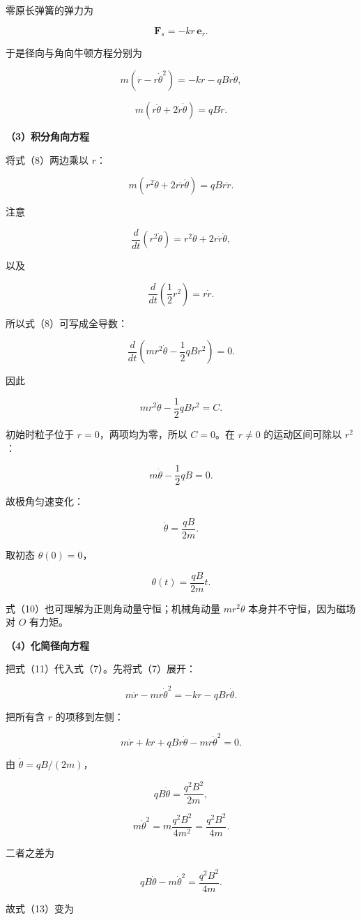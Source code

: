 \documentclass[12pt,a4paper,UTF8]{ctexart}
\begin{document}
零原长弹簧的弹力为

\[\bm F_s=-kr\,\bm e_r.\]

于是径向与角向牛顿方程分别为

\[m(\ddot r-r\dot\theta^2)=-kr-qBr\dot\theta,\]

\[m(r\ddot\theta+2\dot r\dot\theta)=qB\dot r.\]

\textbf{（3）积分角向方程}

将式（8）两边乘以 \(r\)：

\[m(r^2\ddot\theta+2r\dot r\dot\theta)=qBr\dot r.\]

注意

\[\frac{d}{dt}(r^2\dot\theta)=r^2\ddot\theta+2r\dot r\dot\theta,\]

以及

\[\frac{d}{dt}\left(\frac12r^2\right)=r\dot r.\]

所以式（8）可写成全导数：

\[\frac{d}{dt}\left(mr^2\dot\theta-\frac12qBr^2\right)=0.\]

因此

\[mr^2\dot\theta-\frac12qBr^2=C.\]

初始时粒子位于 \(r=0\)，两项均为零，所以 \(C=0\)。在 \(r\neq0\)
的运动区间可除以 \(r^2\)：

\[m\dot\theta-\frac12qB=0.\]

故极角匀速变化：

\[\boxed{\dot\theta=\frac{qB}{2m}}.\]

取初态 \(\theta(0)=0\)，

\[\boxed{\theta(t)=\frac{qB}{2m}t}.\]

式（10）也可理解为正则角动量守恒；机械角动量 \(mr^2\dot\theta\)
本身并不守恒，因为磁场对 \(O\) 有力矩。

\textbf{（4）化简径向方程}

把式（11）代入式（7）。先将式（7）展开：

\[m\ddot r-mr\dot\theta^2=-kr-qBr\dot\theta.\]

把所有含 \(r\) 的项移到左侧：

\[m\ddot r+kr+qBr\dot\theta-mr\dot\theta^2=0.\]

由 \(\dot\theta=qB/(2m)\)，

\[qB\dot\theta=\frac{q^2B^2}{2m},\]

\[m\dot\theta^2=m\frac{q^2B^2}{4m^2}=\frac{q^2B^2}{4m}.\]

二者之差为

\[qB\dot\theta-m\dot\theta^2=\frac{q^2B^2}{4m}.\]

故式（13）变为
\end{document}
